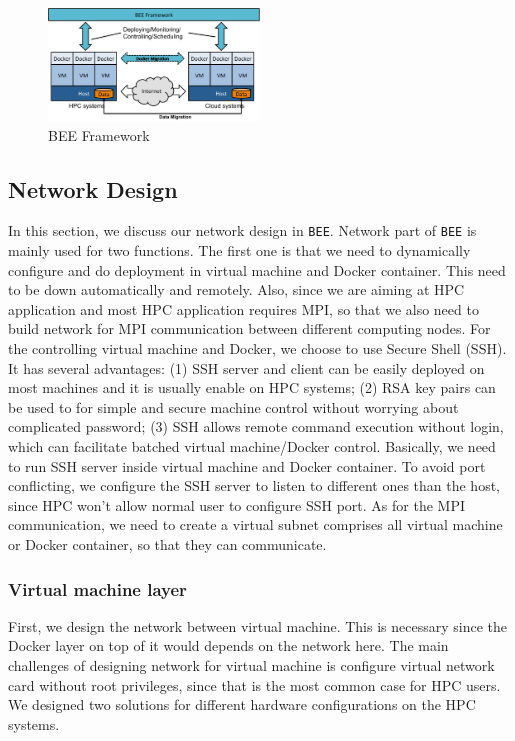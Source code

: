 \begin{figure}[h]
    \centering
    \caption{BEE Framework}
    \label{bee-framework}
    \includegraphics[width=0.5\textwidth]{figures/bee-framework.pdf}
\end{figure}
 
\subsection{Network Design}
In this section, we discuss our network design in \texttt{BEE}. Network part of \texttt{BEE} is mainly used for two functions. The first one is that we need to dynamically configure and do deployment in virtual machine and Docker container. This need to be down automatically and remotely. Also, since we are aiming at HPC application and most HPC application requires MPI, so that we also need to build network for MPI communication between different computing nodes. For the controlling virtual machine and Docker, we choose to use Secure Shell (SSH). It has several advantages: (1) SSH server and client can be easily deployed on most machines and it is usually enable on HPC systems; (2) RSA key pairs can be used to for simple and secure machine control without worrying about complicated password; (3) SSH allows remote command execution without login, which can facilitate batched virtual machine/Docker control. Basically, we need to run SSH server inside virtual machine and Docker container. To avoid port conflicting, we configure the SSH server to listen to different ones than the host, since HPC won't allow normal user to configure SSH port. As for the MPI communication, we need to create a virtual subnet comprises all virtual machine or Docker container, so that they can communicate.

\subsubsection{Virtual machine layer}

First, we design the network between virtual machine. This is necessary since the Docker layer on top of it would depends on the network here. The main challenges of designing network for virtual machine is configure virtual network card without root privileges, since that is the most common case for HPC users. We designed two solutions for different hardware configurations on the HPC systems.

